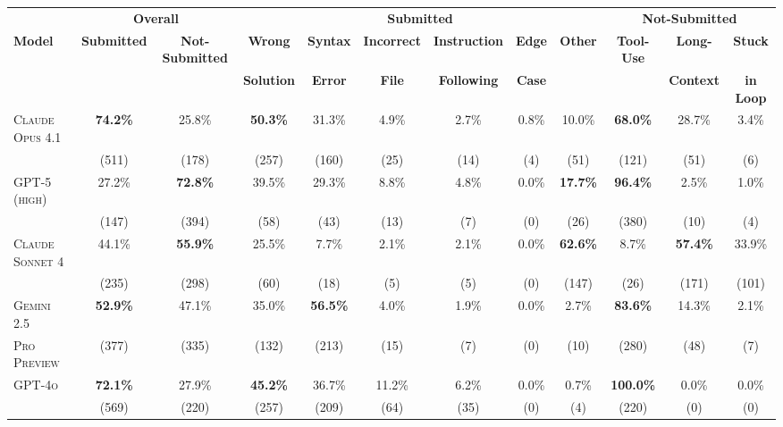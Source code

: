 \begin{table}[t]
\centering
\small
\setlength{\tabcolsep}{5pt}
\renewcommand{\arraystretch}{1.3}
\begin{adjustbox}{max width=\linewidth}
\begin{tabular}{|l|cc|cccccc|ccc|}
\hline
& \multicolumn{2}{c|}{\textbf{Overall}} & \multicolumn{6}{c|}{\textbf{Submitted}} & \multicolumn{3}{c|}{\textbf{Not-Submitted}} \\
\cline{2-12}
\textbf{Model} & \textbf{Submitted} & \textbf{Not-Submitted} & \textbf{Wrong} & \textbf{Syntax} & \textbf{Incorrect} & \textbf{Instruction} & \textbf{Edge} & \textbf{Other} & \textbf{Tool-Use} & \textbf{Long-} & \textbf{Stuck} \\
& & & \textbf{Solution} & \textbf{Error} & \textbf{File} & \textbf{Following} & \textbf{Case} & & & \textbf{Context} & \textbf{in Loop} \\
\hline
\textsc{Claude Opus 4.1}   & \textbf{74.2\%} & 25.8\% & \textbf{50.3\%} & 31.3\% & 4.9\% & 2.7\% & 0.8\% & 10.0\% & \textbf{68.0\%} & 28.7\% & 3.4\% \\
           & (511)  & (178)  & (257)  & (160)  & (25)  & (14)  & (4)   & (51)   & (121)  & (51)   & (6)    \\
\hline
\textsc{GPT-5 (high)}      & 27.2\% & \textbf{72.8\%} & 39.5\% & 29.3\% & 8.8\% & 4.8\% & 0.0\% & \textbf{17.7\%} & \textbf{96.4\%} & 2.5\%  & 1.0\%  \\
           & (147)  & (394)  & (58)   & (43)   & (13)  & (7)   & (0)   & (26)   & (380)  & (10)   & (4)    \\
\hline
\textsc{Claude Sonnet 4}   & 44.1\% & \textbf{55.9\%} & 25.5\% & 7.7\%  & 2.1\% & 2.1\% & 0.0\% & \textbf{62.6\%} & 8.7\%  & \textbf{57.4\%} & 33.9\% \\
           & (235)  & (298)  & (60)   & (18)   & (5)   & (5)   & (0)   & (147)  & (26)   & (171)  & (101)  \\
\hline
\textsc{Gemini 2.5} & \textbf{52.9\%} & 47.1\% & 35.0\% & \textbf{56.5\%} & 4.0\% & 1.9\% & 0.0\% & 2.7\%  & \textbf{83.6\%} & 14.3\% & 2.1\%  \\
           \textsc{Pro Preview} & (377)  & (335)  & (132)  & (213)  & (15)  & (7)   & (0)   & (10)   & (280)  & (48)   & (7)    \\
\hline
\textsc{GPT-4o}     & \textbf{72.1\%} & 27.9\% & \textbf{45.2\%} & 36.7\% & 11.2\% & 6.2\% & 0.0\% & 0.7\%  & \textbf{100.0\%} & 0.0\%  & 0.0\%  \\
           & (569)  & (220)  & (257)  & (209)  & (64)  & (35)  & (0)   & (4)    & (220)  & (0)    & (0)    \\

\end{tabular}
\end{adjustbox}
\end{table}
